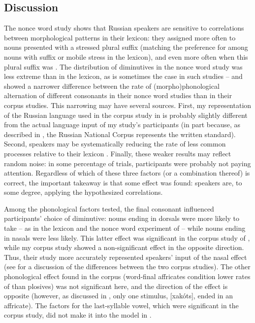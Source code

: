 \documentclass[output=paper,colorlinks,citecolor=brown
]{langscibook}
\begin{document}
\subsection{Discussion}
The nonce word study shows that Russian speakers are sensitive to correlations between morphological patterns in their lexicon: they assigned \ok{} more often to nouns presented with a stressed plural suffix (matching the preference for \ok{} among nouns with suffix or mobile stress in the lexicon), and even more often when this plural suffix was \pla{}. The distribution of diminutives in the nonce word study was less extreme than in the lexicon, as is sometimes the case in such studies -- \citet{Ernestus.Baayen2003} and \citet{Zuraw2010} showed a narrower difference between the rate of (morpho)phonological alternation of different consonants in their nonce word studies than in their corpus studies. This narrowing may have several sources. First, my representation of the Russian language used in the corpus study in  is probably slightly different from the actual language input of my study's participants (in part because, as described in , the Russian National Corpus represents the written standard). Second, speakers may be systematically reducing the rate of less common processes relative to their lexicon \citep[see][]{Hughto.etal2019}. Finally, these weaker results may reflect random noise: in some percentage of trials, participants were probably not paying attention. Regardless of which of these three factors (or a combination thereof) is correct, the important takeaway is that some effect was found: speakers are, to some degree, applying the hypothesized correlations.

Among the phonological factors tested, the final consonant influenced participants' choice of diminutive: nouns ending in dorsals were more likely to take \ok{} -- as in the lexicon and the nonce word experiment of \citet{Gouskova.etal2015} -- while nouns ending in nasals were less likely. This latter effect was significant in the corpus study of \citet{Gouskova.etal2015}, while my corpus study showed a non-significant effect in the opposite direction. Thus, their study more accurately represented speakers' input of the nasal effect (see  for a discussion of the differences between the two corpus studies). The other phonological effect found in the corpus (word-final affricates condition lower rates of \ok{} than plosives) was not significant here, and the direction of the effect is opposite (however, as discussed in , only one stimulus, [xakóts], ended in an affricate). The factors for the last-syllable vowel, which were significant in the corpus study, did not make it into the model in .
\end{document}

